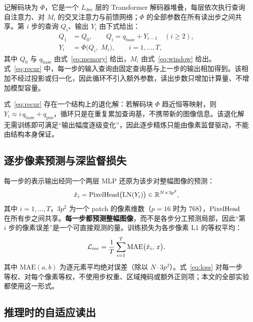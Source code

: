 记解码块为 $\Phi$，它是一个 $L_{\mathrm{dec}}$ 层的 Transformer 解码器堆叠，每层依次执行查询自注意力、对 $M_i$ 的交叉注意力与前馈网络；$\Phi$ 的全部参数在所有读出步之间共享。第 $i$ 步的查询 $Q_i$、输出 $Y_i$ 由下式给出：
\begin{equation}
\begin{aligned}
Q_1&=Q_0,\qquad Q_i=q_{\mathrm{base}}+Y_{i-1}\quad(i\ge 2),\\
Y_i&=\Phi\big(Q_i,\;M_i\big),\qquad i=1,\dots,T,
\end{aligned}
\label{eq:recur}
\end{equation}
其中 $Q_0$ 与 $q_{\mathrm{base}}$ 由式~\eqref{eq:memory} 给出，$M_i$ 由式~\eqref{eq:window} 给出。式~\eqref{eq:recur} 中，每一步的输入查询由固定查询基与上一步的输出相加得到。该相加不经过投影或归一化，因此循环不引入额外参数，读出步数只增加计算量、不增加模型容量。

式~\eqref{eq:recur} 存在一个结构上的退化解：若解码块 $\Phi$ 趋近恒等映射，则 $Y_i\approx i\,q_{\mathrm{base}}+q_{\mathrm{pos}}$，循环只是在重复累加查询基，不携带新的图像信息。该退化解无需训练即可满足“输出幅度逐级变化”，因此逐步精炼只能由像素监督驱动，不能由结构本身保证。

\subsection{\heiti 逐步像素预测与深监督损失}
\label{sec:loss}

每一步的表示输出经同一个两层 MLP 还原为该步对整幅图像的预测：
\begin{equation}
\hat{x}_i=\mathrm{PixelHead}\big(\mathrm{LN}(Y_i)\big)\in\mathbb{R}^{N\times 3p^2},
\label{eq:pred}
\end{equation}
其中 $i=1,\dots,T$，$3p^2$ 为一个 patch 的像素维数（$p=16$ 时为 768），$\mathrm{PixelHead}$ 在所有步之间共享。\textbf{每一步都预测整幅图像}，而不是各步分工预测局部，因此“第 $i$ 步的像素误差”是一个可直接观测的量。训练损失为各步像素 L1 的等权平均：
\begin{equation}
\mathcal{L}_{\mathrm{rec}}=\frac{1}{T}\sum_{i=1}^{T}\mathrm{MAE}\big(\hat{x}_i,\,x\big),
\label{eq:loss}
\end{equation}
其中 $\mathrm{MAE}(a,b)$ 为逐元素平均绝对误差（除以 $N\cdot 3p^2$）。式~\eqref{eq:loss} 对每一步等权、对每个像素等权，不使用步权重、区域掩码或额外正则项；本文的全部实验都使用这一形式。

\subsection{\heiti 推理时的自适应读出}
\label{sec:truncate}

